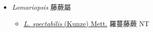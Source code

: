 
  \begin{itemize}
 \item[    ] \textit{Lomariopsis} 藤蕨屬
                                
  \begin{itemize}
        \item[] \href{http://www.theplantlist.org/tpl1.1/search?q=Lomariopsis+spectabilis}{\textit{L. spectabilis} (Kunze) Mett.}   羅蔓藤蕨   NT
  \end{itemize}
  \end{itemize}
